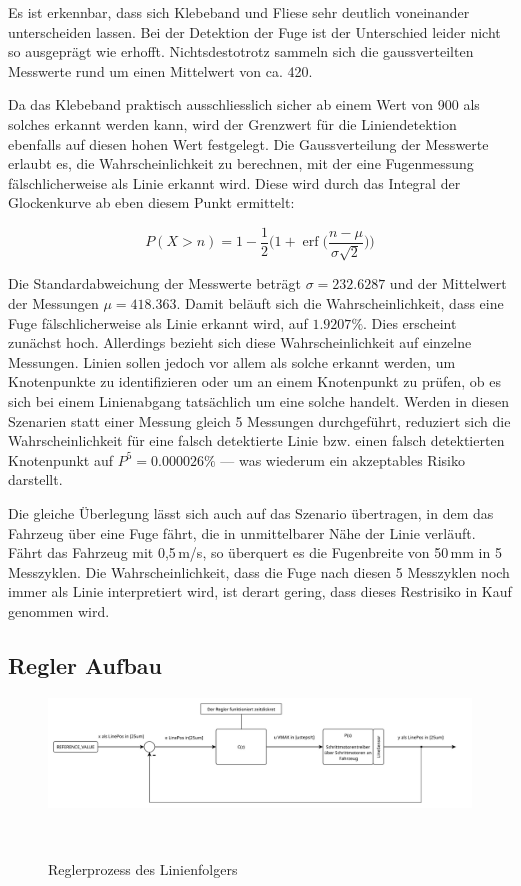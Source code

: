 \documentclass[main.tex]{subfiles} %
\begin{document}
Es ist erkennbar, dass sich Klebeband und Fliese sehr deutlich voneinander
unterscheiden lassen. Bei der Detektion der Fuge ist der Unterschied leider
nicht so ausgeprägt wie erhofft. Nichtsdestotrotz sammeln sich die
gaussverteilten Messwerte rund um einen Mittelwert von ca. 420.

Da das Klebeband praktisch ausschliesslich sicher ab einem Wert von 900 als
solches erkannt werden kann, wird der Grenzwert für die Liniendetektion
ebenfalls auf diesen hohen Wert festgelegt. Die Gaussverteilung der Messwerte
erlaubt es, die Wahrscheinlichkeit zu berechnen, mit der eine Fugenmessung
fälschlicherweise als Linie erkannt wird. Diese wird durch das Integral der
Glockenkurve ab eben diesem Punkt ermittelt:

\[
    P(X > n) = 1 - \frac{1}{2} \Bigg( 1 + \operatorname{erf}\!\Bigg( \frac{n - \mu}{\sigma \sqrt{2}} \Bigg) \Bigg)
\]

Die Standardabweichung der Messwerte beträgt \(\sigma = 232.6287\) und der
Mittelwert der Messungen \(\mu = 418.363\). Damit beläuft sich die
Wahrscheinlichkeit, dass eine Fuge fälschlicherweise als Linie erkannt wird,
auf \(1.9207\%\). Dies erscheint zunächst hoch. Allerdings bezieht sich diese
Wahrscheinlichkeit auf einzelne Messungen. Linien sollen jedoch vor allem als
solche erkannt werden, um Knotenpunkte zu identifizieren oder um an einem
Knotenpunkt zu prüfen, ob es sich bei einem Linienabgang tatsächlich um eine
solche handelt. Werden in diesen Szenarien statt einer Messung gleich 5
Messungen durchgeführt, reduziert sich die Wahrscheinlichkeit für eine falsch
detektierte Linie bzw. einen falsch detektierten Knotenpunkt auf \(P^5 =
0.000026\%\) --- was wiederum ein akzeptables Risiko darstellt.

Die gleiche Überlegung lässt sich auch auf das Szenario übertragen, in dem das
Fahrzeug über eine Fuge fährt, die in unmittelbarer Nähe der Linie verläuft.
Fährt das Fahrzeug mit 0,5\,m/s, so überquert es die Fugenbreite von 50\,mm in
5 Messzyklen. Die Wahrscheinlichkeit, dass die Fuge nach diesen 5 Messzyklen
noch immer als Linie interpretiert wird, ist derart gering, dass dieses
Restrisiko in Kauf genommen wird.


\subsection*{Regler Aufbau}

\begin{figure}[H]
    \centering
    \includegraphics[width=1.0\linewidth]{fig_Parametrierung_Linienfolgeregler/RegelProzess_Linienfolger.pdf}
    \caption{Reglerprozess des Linienfolgers}~\label{fig:Linienfolger_RegelProzess}
\end{figure}
\end{document}
